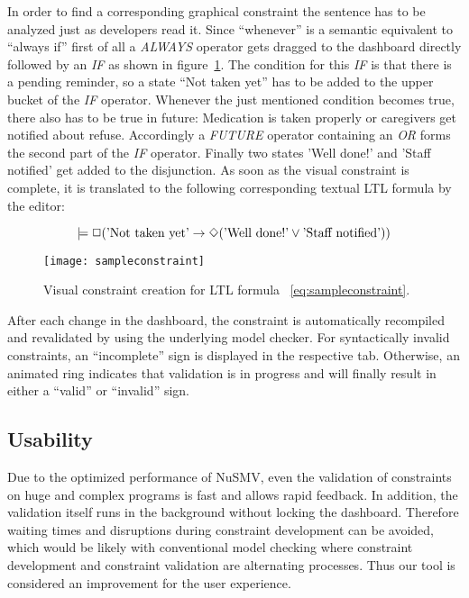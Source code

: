 In order to find a corresponding graphical constraint the sentence has to be analyzed just as developers read it. Since ``whenever'' is a semantic equivalent to ``always if'' first of all a \emph{ALWAYS} operator gets dragged to the dashboard directly followed by an \emph{IF} as shown in figure~\ref{fig:sampleconstraint}. The condition for this \emph{IF} is that there is a pending reminder, so a state ``Not taken yet'' has to be added to the upper bucket of the \emph{IF} operator.
Whenever the just mentioned condition becomes true, there also has to be true in future: Medication is taken properly or caregivers get notified about refuse. Accordingly a \emph{FUTURE} operator containing an \emph{OR} forms the second part of the \emph{IF} operator. Finally two states 'Well done!' and 'Staff notified' get added to the disjunction.
As soon as the visual constraint is complete, it is translated to the following corresponding textual LTL formula by the editor:

\begin{equation} \label{eq:sampleconstraint}
  \models \Box (\textnormal{'Not taken yet'} \rightarrow \Diamond (\textnormal{'Well done!'} \vee \textnormal{'Staff notified'}))
\end{equation}

\begin{figure}[htbp]
  \centering
  \texttt{[image: sampleconstraint]}
  \caption{Visual constraint creation for LTL formula ~\ref{eq:sampleconstraint}.}
  \label{fig:sampleconstraint}
\end{figure}

After each change in the dashboard, the constraint is automatically recompiled and revalidated by using the underlying model checker. For syntactically invalid constraints, an ``incomplete'' sign is displayed in the respective tab. Otherwise, an animated ring indicates that validation is in pro\-gress and will finally result in either a ``valid'' or ``invalid'' sign.



\subsection{Usability}

Due to the optimized performance of NuSMV, even the validation of constraints on huge and complex programs is fast and allows rapid feedback. In addition, the validation itself runs in the background without locking the dashboard. Therefore waiting times and disruptions during constraint development can be avoided, which would be likely with conventional model checking where constraint development and constraint validation are alternating processes. Thus our tool is considered an improvement for the user experience.

